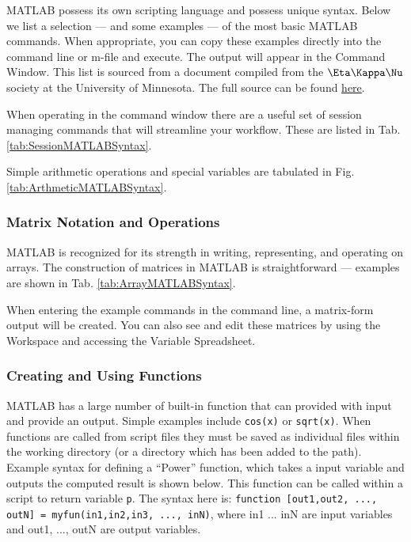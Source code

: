 MATLAB possess its own scripting language and possess unique syntax. Below we list a selection --- and some examples --- of the most basic MATLAB commands. When appropriate, you can copy these examples directly into the command line or m-file and execute. The output will appear in the Command Window. This list is sourced from a document compiled from the $\Eta \Kappa \Nu$ society at the University of Minnesota. The full source can be found  \href{http://www.hkn.umn.edu/resources/files/matlab/MatlabCommands.pdf}{here}.

When operating in the command window there are a useful set of session managing commands that will streamline your workflow. These are listed in Tab. \ref{tab:SessionMATLABSyntax}. 



Simple arithmetic operations and special variables are tabulated in Fig. \ref{tab:ArthmeticMATLABSyntax}.



\subsubsection{Matrix Notation and Operations}

MATLAB is recognized for its strength in writing, representing, and operating on arrays. The construction of matrices in MATLAB is straightforward --- examples are shown in Tab. \ref{tab:ArrayMATLABSyntax}.

When entering the example commands in the command line, a matrix-form output will be created. You can also see and edit these matrices by using the Workspace and accessing the Variable Spreadsheet.



\subsubsection{Creating and Using Functions}

MATLAB has a large number of built-in function that can provided with input and provide an output. Simple examples include {\lstinline[style=Matlab-editor]!cos(x)!} or {\lstinline[style=Matlab-editor]!sqrt(x)!}. When functions are called from script files they must be saved as individual files within the working directory (or a directory which has been added to the path). Example syntax for defining a ``Power'' function, which takes a input variable and outputs the computed result is shown below. This function can be called within a script to return variable {\lstinline[style=Matlab-editor]!p!}. The syntax here is: {\lstinline[style=Matlab-editor]!function [out1,out2, ..., outN] = myfun(in1,in2,in3, ..., inN)!}, where in1 ... inN are input variables and out1, ..., outN are output variables.

